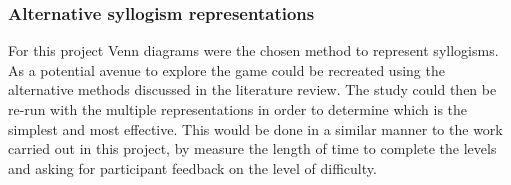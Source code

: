 \documentclass[12pt,a4paper]{report}
\begin{document}
\subsubsection{Alternative syllogism representations}
For this project Venn diagrams were the chosen method to represent syllogisms. As a potential avenue to explore the game could be recreated using the alternative methods discussed in the literature review. The study could then be re-run with the multiple representations in order to determine which is the simplest and most effective. This would be done in a similar manner to the work carried out in this project, by measure the length of time to complete the levels and asking for participant feedback on the level of difficulty.




 
\end{document}

